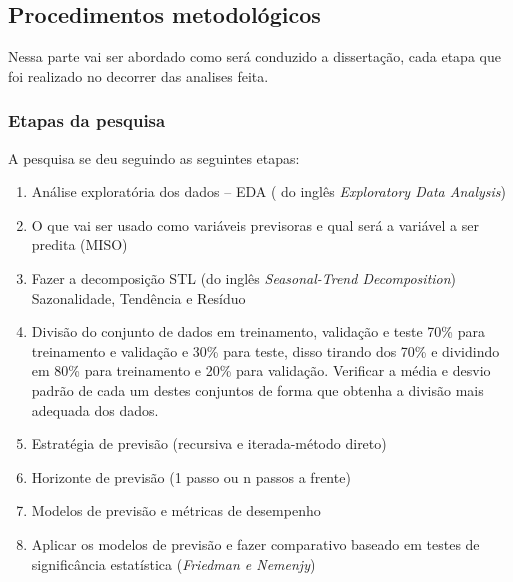\subsection{Procedimentos metodol{\'o}gicos} \label{subsec:metod}

Nessa parte vai ser abordado como será conduzido a dissertação, cada etapa que foi realizado no decorrer das analises feita.
   
    \subsubsection{Etapas da pesquisa}\label{subsubsec:etp}
    A pesquisa se deu seguindo as seguintes etapas:
    
    \begin{enumerate}[start=1, label = {\textbf{Etapa} \arabic* } ]
    	\item Análise exploratória dos dados – EDA ( do inglês \textit{Exploratory Data Analysis}) \label{etp:1}
    	\item O que vai ser usado como variáveis previsoras e qual será a variável a ser predita (MISO) \label{etp:2}
    	\item Fazer a decomposição STL (do inglês \textit{Seasonal-Trend Decomposition}) Sazonalidade, Tendência e Resíduo \label{etp:3}
    	\item Divisão do conjunto de dados em treinamento, validação e teste 70\% para treinamento e validação e 30\% para teste, disso tirando dos 70\% e dividindo em 80\% para treinamento e 20\% para validação. Verificar a média e desvio padrão de cada um destes conjuntos de forma que obtenha a divisão mais adequada dos dados. \label{etp:4}
    	\item Estratégia de previsão (recursiva e iterada-método direto) \label{etp:5}
    	\item Horizonte de previsão (1 passo ou n passos a frente) \label{etp:6}
    	\item Modelos de previsão e métricas de desempenho \label{etp:7}
    	\item Aplicar os modelos de previsão e fazer comparativo baseado em testes de significância estatística (\textit{Friedman e Nemenjy}) \label{etp:9}
    \end{enumerate}


